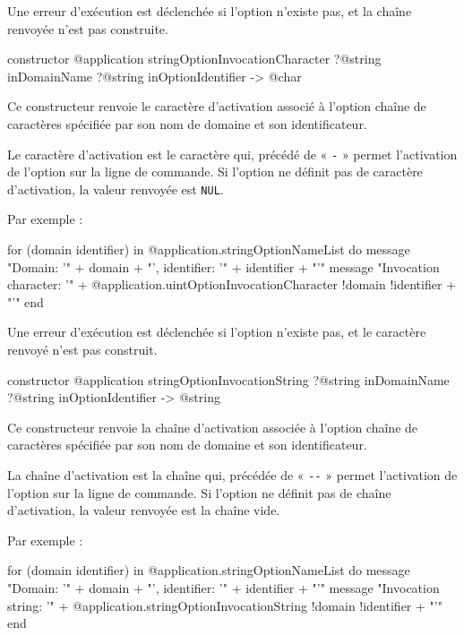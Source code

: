 Une erreur d'exécution est déclenchée si l'option n'existe pas, et la chaîne renvoyée n'est pas construite.



\begin{galgas4box}
constructor @application stringOptionInvocationCharacter
    ?@string inDomainName
    ?@string inOptionIdentifier -> @char
\end{galgas4box}

Ce constructeur renvoie le caractère d'activation associé à l'option chaîne de caractères spécifiée par son nom de domaine et son identificateur.

Le caractère d'activation est le caractère qui, précédé de « \texttt{-} » permet l'activation de l'option sur la ligne de commande. Si l'option ne définit pas de caractère d'activation, la valeur renvoyée est \texttt{NUL}.

 Par exemple :
\begin{galgas4}
for (domain identifier) in @application.stringOptionNameList do
  message "Domain: '" + domain + "', identifier: '" + identifier + "'\n"
  message "Invocation character: '"
    + @application.uintOptionInvocationCharacter {!domain !identifier} + "'\n"
end
\end{galgas4}

Une erreur d'exécution est déclenchée si l'option n'existe pas, et le caractère renvoyé n'est pas construit.



\begin{galgas4box}
constructor @application stringOptionInvocationString
    ?@string inDomainName
    ?@string inOptionIdentifier -> @string
\end{galgas4box}

Ce constructeur renvoie la chaîne d'activation associée à l'option chaîne de caractères spécifiée par son nom de domaine et son identificateur.

La chaîne d'activation est la chaîne qui, précédée de « \texttt{-{}-} » permet l'activation de l'option sur la ligne de commande. Si l'option ne définit pas de chaîne d'activation, la valeur renvoyée est la chaîne vide.

 Par exemple :
\begin{galgas4}
for (domain identifier) in @application.stringOptionNameList do
  message "Domain: '" + domain + "', identifier: '" + identifier + "'\n"
  message "Invocation string: '"
    + @application.stringOptionInvocationString {!domain !identifier} + "'\n"
end
\end{galgas4}

